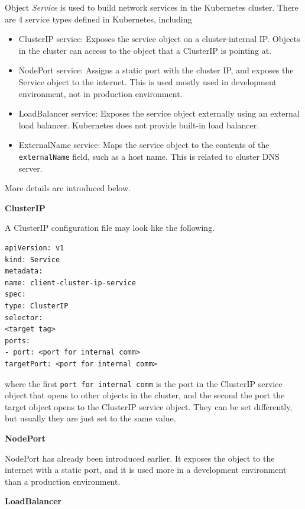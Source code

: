 Object \textit{Service} is used to build network services in the Kubernetes cluster. There are 4 service types defined in Kubernetes, including
\begin{itemize}
	\item ClusterIP service: Exposes the service object on a cluster-internal IP. Objects in the cluster can access to the object that a ClusterIP is pointing at.
	\item NodePort service: Assigns a static port with the cluster IP, and exposes the Service object to the internet. This is used mostly used in development environment, not in production environment.
	\item LoadBalancer service: Exposes the service object externally using an external load balancer. Kubernetes does not provide built-in load balancer.
	\item ExternalName service: Maps the service object to the contents of the \verb|externalName| field, such as a host name. This is related to cluster DNS server.
\end{itemize}

More details are introduced below.

\vspace{0.1in}
\noindent \textbf{ClusterIP}
\vspace{0.1in}

A ClusterIP configuration file may look like the following.
\begin{lstlisting}
apiVersion: v1
kind: Service
metadata:
name: client-cluster-ip-service
spec:
type: ClusterIP
selector:
<target tag>
ports:
- port: <port for internal comm>
targetPort: <port for internal comm>
\end{lstlisting}
where the first \verb|port for internal comm| is the port in the ClusterIP service object that opens to other objects in the cluster, and the second the port the target object opens to the ClusterIP service object. They can be set differently, but usually they are just set to the same value.

\vspace{0.1in}
\noindent \textbf{NodePort}
\vspace{0.1in}

NodePort has already been introduced earlier. It exposes the object to the internet with a static port, and it is used more in a development environment than a production environment.

\vspace{0.1in}
\noindent \textbf{LoadBalancer}
\vspace{0.1in}

